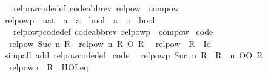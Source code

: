 \begin{isabellebody}
\ \ \ relpow{\isacharunderscore}{\kern0pt}code{\isacharunderscore}{\kern0pt}def\ {\isacharbrackleft}{\kern0pt}code{\isacharunderscore}{\kern0pt}abbrev{\isacharbrackright}{\kern0pt}{\isacharcolon}{\kern0pt}\ {\isachardoublequoteopen}relpow\ {\isacharequal}{\kern0pt}\ compow{\isachardoublequoteclose}\isanewline
\isanewline
{}\isamarkupfalse%
\ relpowp\ {\isacharcolon}{\kern0pt}{\isacharcolon}{\kern0pt}\ {\isachardoublequoteopen}nat\ {\isasymRightarrow}\ {\isacharparenleft}{\kern0pt}{\isacharprime}{\kern0pt}a\ {\isasymRightarrow}\ {\isacharprime}{\kern0pt}a\ {\isasymRightarrow}\ bool{\isacharparenright}{\kern0pt}\ {\isasymRightarrow}\ {\isacharparenleft}{\kern0pt}{\isacharprime}{\kern0pt}a\ {\isasymRightarrow}\ {\isacharprime}{\kern0pt}a\ {\isasymRightarrow}\ bool{\isacharparenright}{\kern0pt}{\isachardoublequoteclose}\isanewline
\ \ \ relpowp{\isacharunderscore}{\kern0pt}code{\isacharunderscore}{\kern0pt}def\ {\isacharbrackleft}{\kern0pt}code{\isacharunderscore}{\kern0pt}abbrev{\isacharbrackright}{\kern0pt}{\isacharcolon}{\kern0pt}\ {\isachardoublequoteopen}relpowp\ {\isacharequal}{\kern0pt}\ compow{\isachardoublequoteclose}\isanewline
\isanewline
{}\isamarkupfalse%
\ {\isacharbrackleft}{\kern0pt}code{\isacharbrackright}{\kern0pt}{\isacharcolon}{\kern0pt}\isanewline
\ \ {\isachardoublequoteopen}relpow\ {\isacharparenleft}{\kern0pt}Suc\ n{\isacharparenright}{\kern0pt}\ R\ {\isacharequal}{\kern0pt}\ {\isacharparenleft}{\kern0pt}relpow\ n\ R{\isacharparenright}{\kern0pt}\ O\ R{\isachardoublequoteclose}\isanewline
\ \ {\isachardoublequoteopen}relpow\ {}\ R\ {\isacharequal}{\kern0pt}\ Id{\isachardoublequoteclose}\isanewline
%
\isadelimproof
\ \ %
\endisadelimproof
%
\isatagproof
{}\isamarkupfalse%
\ {\isacharparenleft}{\kern0pt}simp{\isacharunderscore}{\kern0pt}all\ add{\isacharcolon}{\kern0pt}\ relpow{\isacharunderscore}{\kern0pt}code{\isacharunderscore}{\kern0pt}def{\isacharparenright}{\kern0pt}%
\endisatagproof
{\isafoldproof}%
%
\isadelimproof
\isanewline
%
\endisadelimproof
\isanewline
{}\isamarkupfalse%
\ {\isacharbrackleft}{\kern0pt}code{\isacharbrackright}{\kern0pt}{\isacharcolon}{\kern0pt}\isanewline
\ \ {\isachardoublequoteopen}relpowp\ {\isacharparenleft}{\kern0pt}Suc\ n{\isacharparenright}{\kern0pt}\ R\ {\isacharequal}{\kern0pt}\ {\isacharparenleft}{\kern0pt}R\ {\isacharcircum}{\kern0pt}{\isacharcircum}{\kern0pt}\ n{\isacharparenright}{\kern0pt}\ OO\ R{\isachardoublequoteclose}\isanewline
\ \ {\isachardoublequoteopen}relpowp\ {}\ R\ {\isacharequal}{\kern0pt}\ HOL{\isachardot}{\kern0pt}eq{\isachardoublequoteclose}\isanewline

\end{isabellebody}
